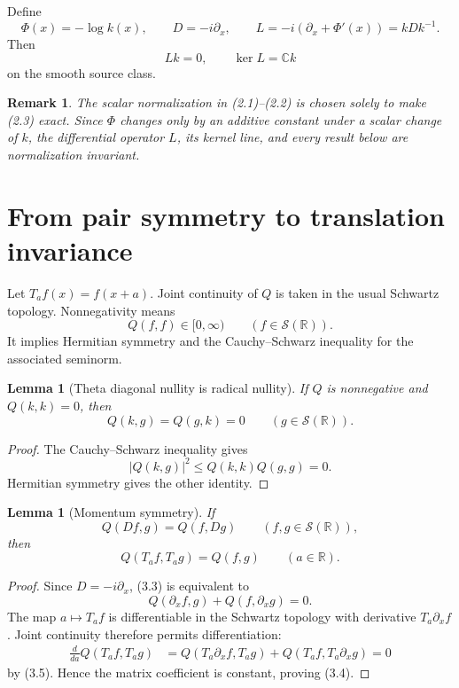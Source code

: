 \documentclass[11pt]{article}
\newtheorem{lemma}[theorem]{Lemma}
\newtheorem{remark}[theorem]{Remark}
\newcommand{\C}{\mathbb C}
\newcommand{\R}{\mathbb R}
\newcommand{\cS}{\mathcal S}
\begin{document}
Define
\[
 \Phi(x)=-\log k(x),\qquad
 D=-i\partial_x,\qquad
 L=-i(\partial_x+\Phi'(x))=kDk^{-1}.
 \tag{2.6}
\]
Then
\[
 Lk=0,\qquad \ker L=\C k
 \tag{2.7}
\]
on the smooth source class.

\begin{remark}
The scalar normalization in (2.1)--(2.2) is chosen solely to make (2.3) exact.  Since
\(\Phi\) changes only by an additive constant under a scalar change of \(k\), the differential
operator \(L\), its kernel line, and every result below are normalization invariant.
\end{remark}

\section{From pair symmetry to translation invariance}\label{sec:translation}

Let \(T_a f(x)=f(x+a)\).  Joint continuity of \(Q\) is taken in the usual Schwartz topology.
Nonnegativity means
\[
 Q(f,f)\in[0,\infty)\qquad(f\in\cS(\R)).
\tag{3.1}
\]
It implies Hermitian symmetry and the Cauchy--Schwarz inequality for the associated seminorm.

\begin{lemma}[Theta diagonal nullity is radical nullity]\label{lem:null-radical}
If \(Q\) is nonnegative and \(Q(k,k)=0\), then
\[
 Q(k,g)=Q(g,k)=0\qquad(g\in\cS(\R)).
\tag{3.2}
\]
\end{lemma}

\begin{proof}
The Cauchy--Schwarz inequality gives
\[
 |Q(k,g)|^2\le Q(k,k)Q(g,g)=0.
\]
Hermitian symmetry gives the other identity.
\end{proof}

\begin{lemma}[Momentum symmetry]\label{lem:translation}
If
\[
 Q(Df,g)=Q(f,Dg)\qquad(f,g\in\cS(\R)),
\tag{3.3}
\]
then
\[
 Q(T_a f,T_a g)=Q(f,g)\qquad(a\in\R).
\tag{3.4}
\]
\end{lemma}

\begin{proof}
Since \(D=-i\partial_x\), (3.3) is equivalent to
\[
 Q(\partial_x f,g)+Q(f,\partial_x g)=0.
\tag{3.5}
\]
The map \(a\mapsto T_a f\) is differentiable in the Schwartz topology with derivative
\(T_a\partial_x f\).  Joint continuity therefore permits differentiation:
\[
\begin{aligned}
 \frac{d}{da}Q(T_a f,T_a g)
 &=Q(T_a\partial_x f,T_a g)+Q(T_a f,T_a\partial_x g)=0
\end{aligned}
\]
by (3.5).  Hence the matrix coefficient is constant, proving (3.4).
\end{proof}
\end{document}
